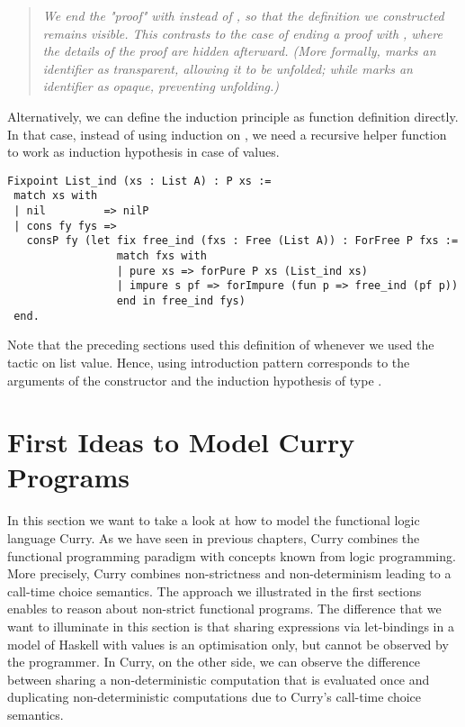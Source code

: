 \begin{quote}
\emph{We end the "proof" with  instead of , so that the definition we constructed remains visible.
This contrasts to the case of ending a proof with , where the details of the proof are hidden afterward.
(More formally,  marks an identifier as transparent, allowing it to be unfolded; while  marks an identifier as opaque, preventing unfolding.)}
\end{quote}

Alternatively, we can define the induction principle as function definition directly.
In that case, instead of using induction on , we need a recursive helper function  to work as induction hypothesis in case of  values.

\begin{verbatim}
Fixpoint List_ind (xs : List A) : P xs :=
 match xs with
 | nil         => nilP
 | cons fy fys =>
   consP fy (let fix free_ind (fxs : Free (List A)) : ForFree P fxs :=
                 match fxs with
                 | pure xs => forPure P xs (List_ind xs)
                 | impure s pf => forImpure (fun p => free_ind (pf p))
                 end in free_ind fys)
 end.
\end{verbatim}

Note that the preceding sections used this definition of  whenever we used the tactic  on list
value.
Hence, using introduction pattern \cinl{[ | fy fys IH ]} corresponds to the arguments of the  constructor and the induction hypothesis of type .

\section{First Ideas to Model Curry Programs}

In this section we want to take a look at how to model the functional logic language Curry.
As we have seen in previous chapters, Curry combines the functional programming paradigm with concepts known from logic programming.
More precisely, Curry combines non-strictness and non-determinism leading to a call-time choice semantics.
The approach we illustrated in the first sections enables to reason about non-strict functional programs.
The difference that we want to illuminate in this section is that sharing expressions via let-bindings in a model of Haskell with  values is an optimisation only, but cannot be observed by the programmer.
In Curry, on the other side, we can observe the difference between sharing a non-deterministic computation that is evaluated once and duplicating non-deterministic computations due to Curry's call-time choice semantics.

